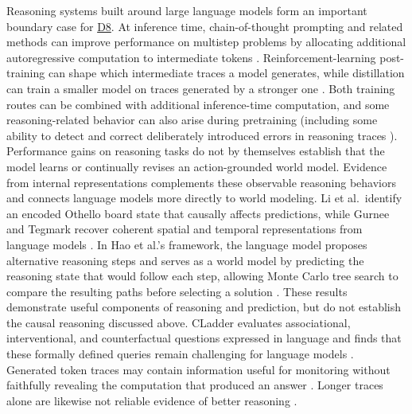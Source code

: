\documentclass[10pt,journal,compsoc]{IEEEtran}
\DeclareRobustCommand{\Dref}[1]{\hyperref[sec:d#1]{D#1}}
\begin{document}
Reasoning systems built around large language models form an important boundary case for \Dref{8}.
At inference time, chain-of-thought prompting and related methods can improve performance on multistep problems by allocating additional autoregressive computation to intermediate tokens \cite{wei2022,li2024b}.
Reinforcement-learning post-training can shape which intermediate traces a model generates, while distillation can train a smaller model on traces generated by a stronger one \cite{guo2025}.
Both training routes can be combined with additional inference-time computation, and some reasoning-related behavior can also arise during pretraining (including some ability to detect and correct deliberately introduced errors in reasoning traces \cite{shah2025}).
Performance gains on reasoning tasks do not by themselves establish that the model learns or continually revises an action-grounded world model.
Evidence from internal representations complements these observable reasoning behaviors and connects language models more directly to world modeling.
Li et al.\ identify an encoded Othello board state that causally affects predictions, while Gurnee and Tegmark recover coherent spatial and temporal representations from language models \cite{li2023,gurnee2024}.
In Hao et al.'s framework, the language model proposes alternative reasoning steps and serves as a world model by predicting the reasoning state that would follow each step, allowing Monte Carlo tree search to compare the resulting paths before selecting a solution \cite{hao2023}.
These results demonstrate useful components of reasoning and prediction, but do not establish the causal reasoning discussed above.
CLadder evaluates associational, interventional, and counterfactual questions expressed in language and finds that these formally defined queries remain challenging for language models \cite{jin2023}.
Generated token traces may contain information useful for monitoring without faithfully revealing the computation that produced an answer \cite{korbak2025,turpin2023}.
Longer traces alone are likewise not reliable evidence of better reasoning \cite{ballon2026}.
\end{document}
